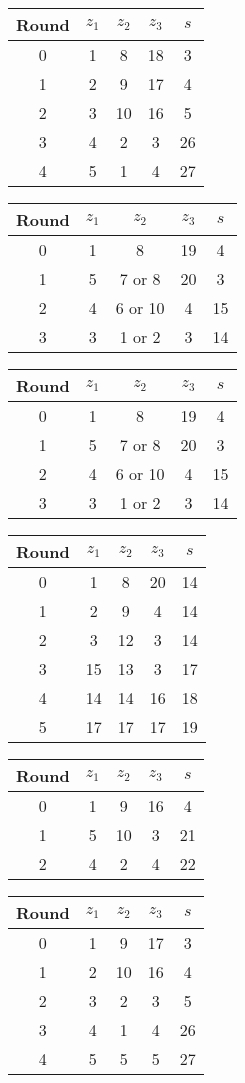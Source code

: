 \begin{tabular}{c | c | c | c | c }
Round & $z_1$ & $z_2$ & $z_3$ & $s$ \\
\hline
0 & 1 & 8 & 18 & 3 \\
1 & 2 & 9 & 17 & 4 \\
2 & 3 & 10 & 16 & 5 \\
3 & 4 & 2 & 3 & 26 \\
4 & 5 & 1 & 4 & 27
\end{tabular}

\begin{tabular}{c | c | c | c | c }
Round & $z_1$ & $z_2$ & $z_3$ & $s$ \\
\hline
0 & 1 & 8 & 19 & 4 \\
1 & 5 & 7 or 8 & 20 & 3 \\
2 & 4 & 6 or 10 & 4 & 15 \\
3 & 3 & 1 or 2 & 3 & 14
\end{tabular}

\begin{tabular}{c | c | c | c | c }
Round & $z_1$ & $z_2$ & $z_3$ & $s$ \\
\hline
0 & 1 & 8 & 19 & 4 \\
1 & 5 & 7 or 8 & 20 & 3 \\
2 & 4 & 6 or 10 & 4 & 15 \\
3 & 3 & 1 or 2 & 3 & 14
\end{tabular}

\begin{tabular}{c | c | c | c | c }
Round & $z_1$ & $z_2$ & $z_3$ & $s$ \\
\hline
0 & 1 & 8 & 20 & 14 \\
1 & 2 & 9 & 4 & 14 \\
2 & 3 & 12 & 3 & 14 \\
3 & 15 & 13 & 3 & 17 \\
4 & 14 & 14 & 16 & 18 \\
5 & 17 & 17 & 17 & 19
\end{tabular}

\begin{tabular}{c | c | c | c | c }
Round & $z_1$ & $z_2$ & $z_3$ & $s$ \\
\hline
0 & 1 & 9 & 16 & 4 \\
1 & 5 & 10 & 3 & 21 \\
2 & 4 & 2 & 4 & 22
\end{tabular}

\begin{tabular}{c | c | c | c | c }
Round & $z_1$ & $z_2$ & $z_3$ & $s$ \\
\hline
0 & 1 & 9 & 17 & 3 \\
1 & 2 & 10 & 16 & 4 \\
2 & 3 & 2 & 3 & 5 \\
3 & 4 & 1 & 4 & 26 \\
4 & 5 & 5 & 5 & 27
\end{tabular}

